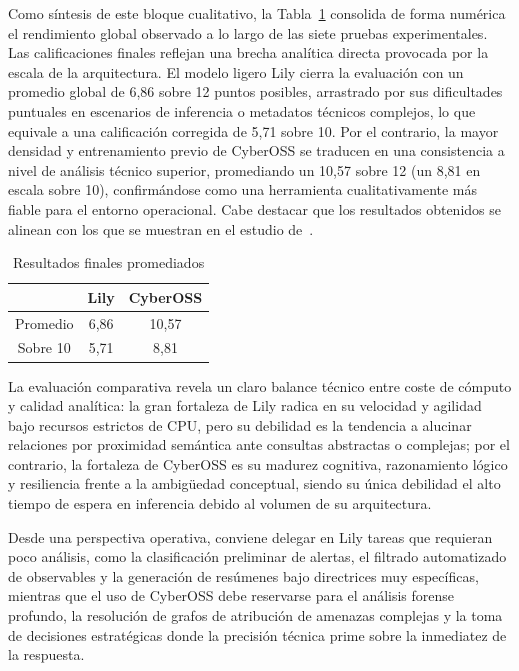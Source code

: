 \documentclass[12pt]{report}
\begin{document}
Como síntesis de este bloque cualitativo, la Tabla~\ref{tab:medias} consolida de forma numérica el rendimiento global observado a lo largo de las siete pruebas experimentales. Las calificaciones finales reflejan una brecha analítica directa provocada por la escala de la arquitectura. El modelo ligero Lily cierra la evaluación con un promedio global de 6,86 sobre 12 puntos posibles, arrastrado por sus dificultades puntuales en escenarios de inferencia o metadatos técnicos complejos, lo que equivale a una calificación corregida de 5,71 sobre 10. Por el contrario, la mayor densidad y entrenamiento previo de CyberOSS se traducen en una consistencia a nivel de análisis técnico superior, promediando un 10,57 sobre 12 (un 8,81 en escala sobre 10), confirmándose como una herramienta cualitativamente más fiable para el entorno operacional. Cabe destacar que los resultados obtenidos se alinean con los que se muestran en el estudio de~\cite{levi2025toward}.

\begin{table}[H]
	\centering
	\small
	\begin{tabular}{ c c c }
		\toprule
		& \textbf{Lily} & \textbf{CyberOSS} \\
		\midrule
		Promedio & 6,86 & 10,57 \\
		Sobre 10 & 5,71 & 8,81 \\
		\bottomrule
	\end{tabular}
	\caption{Resultados finales promediados}
	\label{tab:medias}
\end{table}

La evaluación comparativa revela un claro balance técnico entre coste de cómputo y calidad analítica: la gran fortaleza de Lily radica en su velocidad y agilidad bajo recursos estrictos de CPU, pero su debilidad es la tendencia a alucinar relaciones por proximidad semántica ante consultas abstractas o complejas; por el contrario, la fortaleza de CyberOSS es su madurez cognitiva, razonamiento lógico y resiliencia frente a la ambigüedad conceptual, siendo su única debilidad el alto tiempo de espera en inferencia debido al volumen de su arquitectura. 

Desde una perspectiva operativa, conviene delegar en Lily tareas que requieran poco análisis, como la clasificación preliminar de alertas, el filtrado automatizado de observables y la generación de resúmenes bajo directrices muy específicas, mientras que el uso de CyberOSS debe reservarse para el análisis forense profundo, la resolución de grafos de atribución de amenazas complejas y la toma de decisiones estratégicas donde la precisión técnica prime sobre la inmediatez de la respuesta.
\end{document}
